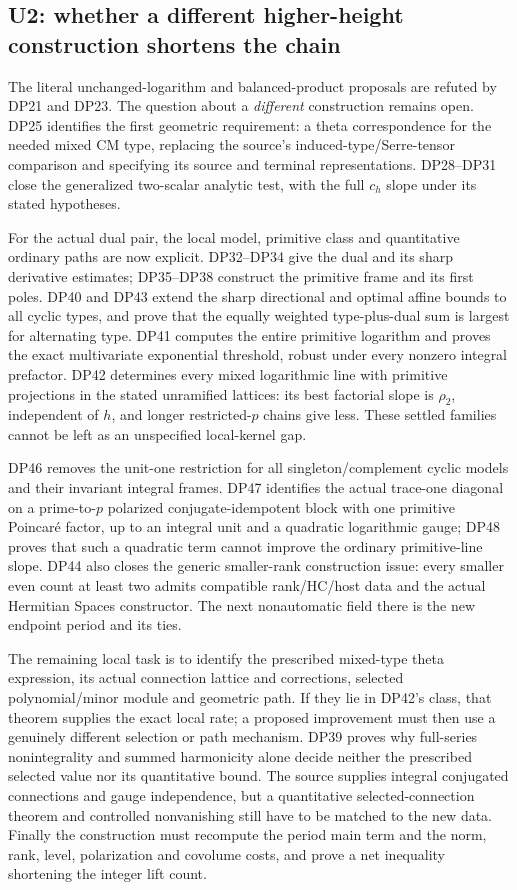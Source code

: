 \documentclass[11pt,a4paper]{article}
\theoremstyle{definition}\newtheorem{remark}[theorem]{Remark}
\begin{document}
\subsection{U2: whether a different higher-height construction shortens the chain}

The literal unchanged-logarithm and balanced-product proposals are refuted by DP21 and DP23. The question about a \emph{different} construction remains open. DP25 identifies the first geometric requirement: a theta correspondence for the needed mixed CM type, replacing the source's induced-type/Serre-tensor comparison and specifying its source and terminal representations. DP28--DP31 close the generalized two-scalar analytic test, with the full $c_h$ slope under its stated hypotheses.

For the actual dual pair, the local model, primitive class and quantitative ordinary paths are now explicit. DP32--DP34 give the dual and its sharp derivative estimates; DP35--DP38 construct the primitive frame and its first poles. DP40 and DP43 extend the sharp directional and optimal affine bounds to all cyclic types, and prove that the equally weighted type-plus-dual sum is largest for alternating type. DP41 computes the entire primitive logarithm and proves the exact multivariate exponential threshold, robust under every nonzero integral prefactor. DP42 determines every mixed logarithmic line with primitive projections in the stated unramified lattices: its best factorial slope is $\rho_2$, independent of $h$, and longer restricted-$p$ chains give less. These settled families cannot be left as an unspecified local-kernel gap.

DP46 removes the unit-one restriction for all singleton/complement cyclic models and their invariant integral frames. DP47 identifies the actual trace-one diagonal on a prime-to-$p$ polarized conjugate-idempotent block with one primitive Poincar\'e factor, up to an integral unit and a quadratic logarithmic gauge; DP48 proves that such a quadratic term cannot improve the ordinary primitive-line slope. DP44 also closes the generic smaller-rank construction issue: every smaller even count at least two admits compatible rank/HC/host data and the actual Hermitian Spaces constructor. The next nonautomatic field there is the new endpoint period and its ties.

The remaining local task is to identify the prescribed mixed-type theta expression, its actual connection lattice and corrections, selected polynomial/minor module and geometric path. If they lie in DP42's class, that theorem supplies the exact local rate; a proposed improvement must then use a genuinely different selection or path mechanism. DP39 proves why full-series nonintegrality and summed harmonicity alone decide neither the prescribed selected value nor its quantitative bound. The source supplies integral conjugated connections and gauge independence, but a quantitative selected-connection theorem and controlled nonvanishing still have to be matched to the new data. Finally the construction must recompute the period main term and the norm, rank, level, polarization and covolume costs, and prove a net inequality shortening the integer lift count.
\end{document}
